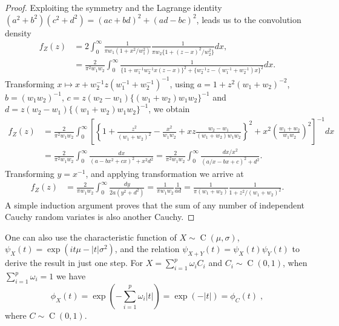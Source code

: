 \documentclass[lineno]{biometrika}
\begin{document}
\begin{proof}
Exploiting the symmetry and the Lagrange identity 
$(a^2 + b^2)(c^2 + d^2) = (ac+bd)^2 + (ad-bc)^2$, leads us to the convolution density
\begin{align*} 
  f_Z(z) &= 2 \int_{0}^{\infty} 
  \frac{1}{ \pi w_1 (1+ x^2/w_1^2)} \frac{1}{\pi w_2 \{1+ (z-x)^2 / w_2^2 \} } dx
  , \\
  & = \frac{2}{\pi^2 w_1 w_2} \int_{0}^{\infty} 
  \frac{1}{ \{1+ w_1^{-1} w_2^{-1} x (z-x) \}^2 + \{w_2^{-1}z - (w_1^{-1}+ w_2^{-1}) x \}^2 } dx.
\end{align*}
Transforming $x \mapsto x + w_2^{-1}z (w_1^{-1} + w_2^{-1})^{-1}$, 
using $a = 1 + z^2(w_1+w_2)^{-2}$, $b =(w_1w_2)^{-1}$, 
$c= z (w_2-w_1) \{(w_1+w_2) w_1 w_2\}^{-1}$ and 
$d = z (w_2-w_1)\{(w_1+w_2) w_1 w_2\}^{-1}$, we obtain
\begin{align*}
  f_Z(z) &= \frac{2}{\pi^2 w_1 w_2} \int_{0}^{\infty} 
  \left[ 
    \left\{ 1 + \frac{z^2}{(w_1+w_2)^2} - \frac{x^2}{w_1w_2} + 
      xz \frac{w_2-w_1}{(w_1+w_2) w_1 w_2} \right\}^2 + 
    x^2 \left(\frac{w_1 + w_2}{w_1w_2} \right)^2 
  \right]^{-1} dx 
  \\
  &= \frac{2}{\pi^2 w_1 w_2} \int_{0}^{\infty} 
  \frac{dx}{\left( a - b x^2 + cx \right)^2 + x^2 d^2} 
  = \frac{2}{\pi^2 w_1 w_2} \int_{0}^{\infty} 
  \frac{dx/x^2}{\left(a/x - bx + c \right)^2 + d^2 }.
\end{align*}
Transforming $y = x^{-1}$, and applying \CS{} transformation we arrive at 
\begin{align*}
  f_Z(z) &= \frac{2}{\pi w_1 w_2} \int_{0}^{\infty} \frac{dy}{2a (y^2 + d^2)} 
  = \frac{1}{\pi w_1 w_2} \frac{1}{ad} 
  = \frac{1}{\pi (w_1+w_2)} \frac{1}{1+ z^2/(w_1+w_2)^2}.
\end{align*}
A simple induction argument proves that the sum of any number of independent
Cauchy random variates is also another Cauchy.
\end{proof}

One can also use the characteristic function of $X \sim \operatorname{C}(\mu, \sigma)$,
$\psi_X(t) = \exp(it \mu - |t| \sigma^2)$, and the relation 
$\psi_{X+Y}(t) = \psi_X(t) \psi_Y(t)$ to derive the result in just one step.  
For $X = \sum_{i=1}^{p} \omega_i C_i$ and $C_i \sim \operatorname{C}(0,1)$, 
when $\sum_{i=1}^{p} \omega_i = 1$ we have 
$$
\phi_X(t) = \exp\left(-\sum_{i=1}^{p}\omega_i |t|\right) = \exp(-|t|) = \phi_C(t)
\;,
$$ 
where $C \sim \operatorname{C}(0,1)$. 
\end{document}
